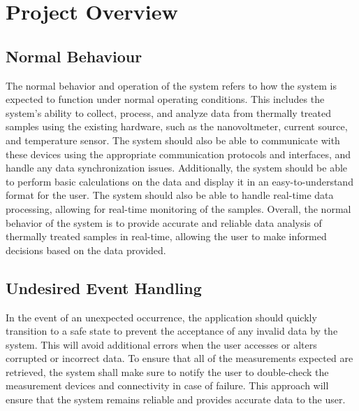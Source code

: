 \documentclass[12pt, titlepage]{article}
\begin{document}
\section{Project Overview}

\subsection{Normal Behaviour}

\noindent The normal behavior and operation of the system refers to how the system is expected to function under normal operating conditions. This includes the system's ability to collect, process, and analyze data from thermally treated samples using the existing hardware, such as the nanovoltmeter, current source, and temperature sensor. The system should also be able to communicate with these devices using the appropriate communication protocols and interfaces, and handle any data synchronization issues. Additionally, the system should be able to perform basic calculations on the data and display it in an easy-to-understand format for the user. The system should also be able to handle real-time data processing, allowing for real-time monitoring of the samples. Overall, the normal behavior of the system is to provide accurate and reliable data analysis of thermally treated samples in real-time, allowing the user to make informed decisions based on the data provided. \\

\subsection{Undesired Event Handling}


\noindent In the event of an unexpected occurrence, the application should quickly transition to a safe state to prevent the acceptance of any invalid data by the system. This will avoid additional errors when the user accesses or alters corrupted or incorrect data. To ensure that all of the measurements expected are retrieved, the system shall make sure to notify the user to double-check the measurement devices and connectivity in case of failure. This approach will ensure that the system remains reliable and provides accurate data to the user. \\
\end{document}
